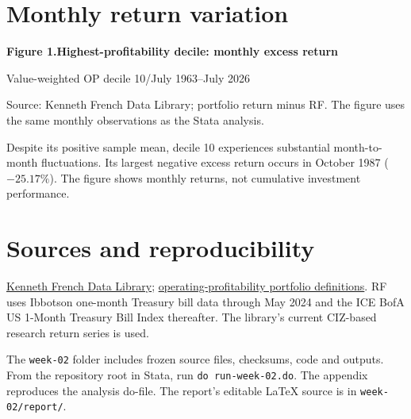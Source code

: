 \documentclass[11pt,letterpaper]{article}
\begin{document}
\section{Monthly return variation}
{\small\bfseries Figure 1.\enspace Highest-profitability decile: monthly excess return}\par
{\footnotesize\color{muted}Value-weighted OP decile 10\enspace /\enspace July 1963--July 2026}
\begin{center}
\end{center}
\vspace{-8pt}
{\footnotesize\color{muted}Source: Kenneth French Data Library; portfolio return minus RF. The figure uses the same monthly observations as the Stata analysis.}\par
Despite its positive sample mean, decile 10 experiences substantial month-to-month fluctuations. Its largest negative excess return occurs in October 1987 ($-25.17\%$). The figure shows monthly returns, not cumulative investment performance.

\section*{Sources and reproducibility}
{\footnotesize
\href{https://mba.tuck.dartmouth.edu/pages/faculty/ken.french/data_library.html}{Kenneth French Data Library}; \href{https://mba.tuck.dartmouth.edu/pages/faculty/ken.french/Data_Library/det_port_form_op.html}{operating-profitability portfolio definitions}. RF uses Ibbotson one-month Treasury bill data through May 2024 and the ICE BofA US 1-Month Treasury Bill Index thereafter. The library's current CIZ-based research return series is used.

The \texttt{week-02} folder includes frozen source files, checksums, code and outputs. From the repository root in Stata, run \texttt{do run-week-02.do}. The appendix reproduces the analysis do-file. The report's editable LaTeX source is in \texttt{week-02/report/}.}
\end{document}
